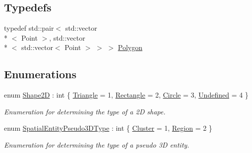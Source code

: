 \subsection*{Typedefs}
\begin{DoxyCompactItemize}
\item 
typedef std\-::pair$<$ std\-::vector\\*
$<$ Point $>$, std\-::vector\\*
$<$ std\-::vector$<$ Point $>$ $>$ $>$ \hyperlink{namespacemultiscale_1_1analysis_a37bc63d1d786b35968c450508f8bcbd3}{Polygon}
\end{DoxyCompactItemize}
\subsection*{Enumerations}
\begin{DoxyCompactItemize}
\item 
enum \hyperlink{namespacemultiscale_1_1analysis_ad895735ef4c40ec7f58424c33cba1b88}{Shape2\-D} \-: int \{ \hyperlink{namespacemultiscale_1_1analysis_ad895735ef4c40ec7f58424c33cba1b88a5e5500cb2b82eb72d550de644bd1b64b}{Triangle} = 1, 
\hyperlink{namespacemultiscale_1_1analysis_ad895735ef4c40ec7f58424c33cba1b88ace9291906a4c3b042650b70d7f3b152e}{Rectangle} = 2, 
\hyperlink{namespacemultiscale_1_1analysis_ad895735ef4c40ec7f58424c33cba1b88a30954d90085f6eaaf5817917fc5fecb3}{Circle} = 3, 
\hyperlink{namespacemultiscale_1_1analysis_ad895735ef4c40ec7f58424c33cba1b88aec0fc0100c4fc1ce4eea230c3dc10360}{Undefined} = 4
 \}
\begin{DoxyCompactList}\small\item\em Enumeration for determining the type of a 2\-D shape. \end{DoxyCompactList}\item 
enum \hyperlink{namespacemultiscale_1_1analysis_a6db9cbf10615e77e300c3e4cb1c56660}{Spatial\-Entity\-Pseudo3\-D\-Type} \-: int \{ \hyperlink{namespacemultiscale_1_1analysis_a6db9cbf10615e77e300c3e4cb1c56660a249694a485fc5d3289c38986b4f8e887}{Cluster} = 1, 
\hyperlink{namespacemultiscale_1_1analysis_a6db9cbf10615e77e300c3e4cb1c56660af447ac856e7e72435904956e3b15f433}{Region} = 2
 \}
\begin{DoxyCompactList}\small\item\em Enumeration for determining the type of a pseudo 3\-D entity. \end{DoxyCompactList}\end{DoxyCompactItemize}


